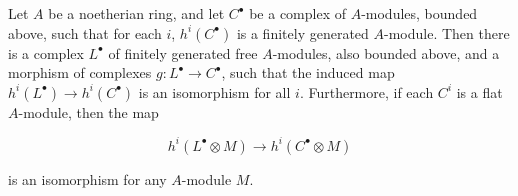 Let $A$ be a noetherian ring, and let $C^\bullet$ be a complex of $A$-modules, bounded above, such that for each $i$, $h^i(C^\bullet)$ is a finitely generated $A$-module. Then there is a complex $L^\bullet$ of finitely generated free $A$-modules, also bounded above, and a morphism of complexes $g: L^\bullet \to C^\bullet$, such that the induced map $h^i(L^\bullet) \to h^i(C^\bullet)$ is an isomorphism for all $i$. Furthermore, if each $C^i$ is a flat $A$-module, then the map

$$h^i(L^\bullet \otimes M) \to h^i(C^\bullet \otimes M)$$

is an isomorphism for any $A$-module $M$.
